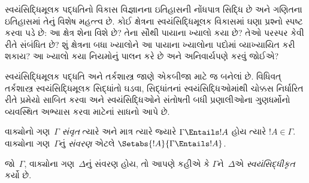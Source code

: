 \begin{explain}
સ્વયંસિદ્ધિમૂલક પદ્ધતિનો વિકાસ વિજ્ઞાનના ઇતિહાસની નોંધપાત્ર સિદ્ધિ
છે અને ગણિતના ઇતિહાસમાં તેનું વિશેષ મહત્ત્વ છે. કોઈ ક્ષેત્રના
સ્વયંસિદ્ધિમૂલક વિકાસમાં ઘણા પ્રશ્નો સ્પષ્ટ કરવા પડે છે: આ ક્ષેત્ર
શેના વિશે છે? તેના સૌથી પાયાના ખ્યાલો કયા છે? તેઓ પરસ્પર કેવી રીતે
સંબંધિત છે? શું ક્ષેત્રના બધા ખ્યાલોને આ પાયાના ખ્યાલોના પદોમાં
વ્યાખ્યાયિત કરી શકાય? આ ખ્યાલો કયા નિયમોનું પાલન કરે છે અને અનિવાર્યપણે
કરવું જોઈએ?

સ્વયંસિદ્ધિમૂલક પદ્ધતિ અને તર્કશાસ્ત્ર જાણે એકબીજા માટે જ બનેલાં છે.
વિધિવત્ તર્કશાસ્ત્ર સ્વયંસિદ્ધિમૂલક સિદ્ધાંતો ઘડવા, સિદ્ધાંતનાં
સ્વયંસિદ્ધિઓમાંથી ચોક્કસ નિર્ધારિત રીતે પ્રમેયો સાબિત કરવા અને
સ્વયંસિદ્ધિઓને સંતોષતી બધી પ્રણાલીઓના ગુણધર્મોનો વ્યવસ્થિત અભ્યાસ
કરવા માટેનાં સાધનો આપે છે.
\end{explain}

\begin{defn}
વાક્યોનો ગણ~$\Gamma$ \emph{સંવૃત} ત્યારે અને માત્ર ત્યારે
જ્યારે $\Gamma \Entails !A$ હોય ત્યારે $!A \in \Gamma$. વાક્યોના
ગણ~$\Gamma$નું \emph{સંવરણ} એટલે
$\Setabs{!A}{\Gamma \Entails !A}$.

જો~$\Gamma$, વાક્યોના ગણ~$\Delta$નું સંવરણ હોય, તો આપણે કહીએ કે
$\Gamma$ને~$\Delta$એ \emph{સ્વયંસિદ્ધીકૃત} કર્યો છે.
\end{defn}

